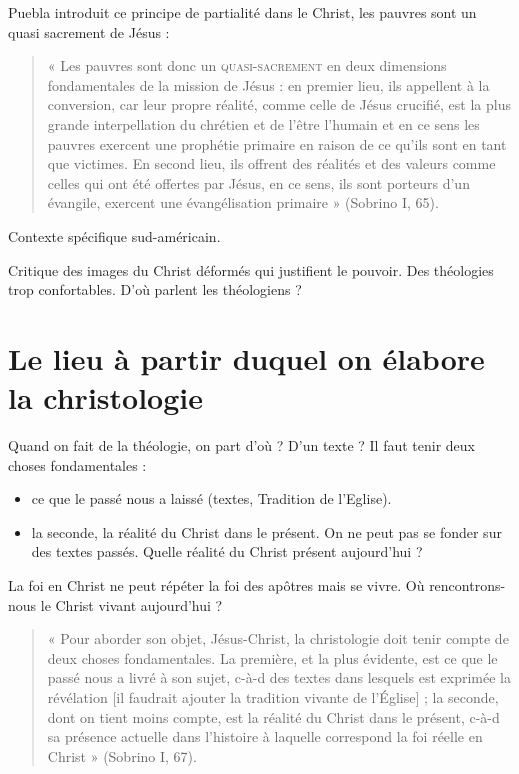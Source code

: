 Puebla introduit ce principe de partialité dans le Christ, les pauvres sont un quasi sacrement de Jésus : 

\begin{quote}
    « Les pauvres sont donc un \textsc{quasi-sacrement} en deux dimensions fondamentales de la mission de
Jésus : en premier lieu, ils appellent à la conversion, car leur propre réalité, comme celle de Jésus
crucifié, est la plus grande interpellation du chrétien et de l’être l’humain et en ce sens les pauvres
exercent une prophétie primaire en raison de ce qu’ils sont en tant que victimes.
En second lieu, ils offrent des réalités et des valeurs comme celles qui ont été offertes par Jésus, en ce
sens, ils sont porteurs d’un évangile, exercent une évangélisation primaire » (Sobrino I, 65).
\end{quote}


\begin{Synthesis}
    Contexte spécifique sud-américain. 
    
    Critique des images du Christ déformés qui justifient le pouvoir. Des théologies trop confortables. D'où parlent les théologiens ?

    
\end{Synthesis}


\section{Le lieu à partir duquel on élabore la christologie}

Quand on fait de la théologie, on part d'où ? D'un texte ? 
Il faut tenir deux choses fondamentales : 
\begin{itemize}
    \item ce que le passé nous a laissé (textes, Tradition de l'Eglise).
    \item la seconde, la réalité du Christ dans le présent. On ne peut pas se fonder sur des textes passés. Quelle réalité du Christ présent aujourd'hui ? 
\end{itemize}

La foi en Christ ne peut répéter la foi des apôtres mais se vivre.
Où rencontrons-nous le Christ vivant aujourd'hui ? 

\begin{quote}
    « Pour aborder son objet, Jésus-Christ, la christologie doit tenir compte de deux choses fondamentales.
La première, et la plus évidente, est ce que le passé nous a livré à son sujet, c-à-d des textes dans
lesquels est exprimée la révélation [il faudrait ajouter la tradition vivante de l’Église] ; la seconde,
dont on tient moins compte, est la réalité du Christ dans le présent, c-à-d sa présence actuelle dans
l’histoire à laquelle correspond la foi réelle en Christ » (Sobrino I, 67).
\end{quote}


